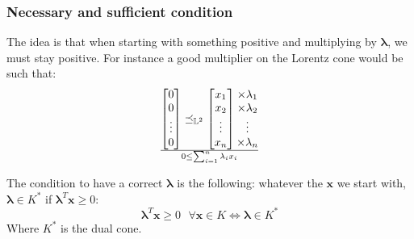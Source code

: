 \subsubsection{Necessary and sufficient condition}
The idea is that when starting with something positive and multiplying by $\boldsymbol{\lambda}$, we must stay positive. For instance a good multiplier on the Lorentz cone would be such that:
\[\begin{bmatrix}
 0\\
 0\\
 \vdots\\
 0
\end{bmatrix} \preceq_{\mathbb{L}^2} \begin{bmatrix}
x_1\\
x_2\\
\vdots\\
x_n
\end{bmatrix}\begin{matrix}
 \times \lambda_1\\
 \times \lambda_2\\
 \vdots\\
 \times \lambda_n
\end{matrix}\over
0 \leq \sum_{i=1}^{n}\lambda_ix_i\]

The condition to have a correct $\boldsymbol{\lambda}$ is the following: whatever the $\boldsymbol{x}$ we start with, $\boldsymbol{\lambda} \in K^*$ if $\boldsymbol{\lambda}^T\boldsymbol{x} \geq 0$:
\[\boldsymbol{\lambda}^T\boldsymbol{x}\geq 0 \textrm{  } \forall \boldsymbol{x} \in K \Leftrightarrow \boldsymbol{\lambda} \in K^* \]
Where $K^*$ is the dual cone.

